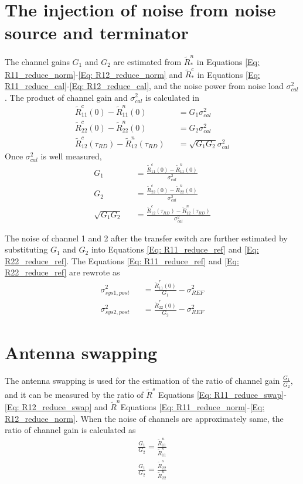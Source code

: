 \documentclass[draftcls]{IEEEtran}
\begin{document}
\section{The injection of noise from noise source and terminator}
The channel gains $G_1$ and $G_2$ are estimated from  $\tilde{R}^n_*$ in Equations \ref{Eq: R11_reduce_norm}-\ref{Eq: R12_reduce_norm} and $\tilde{R}^c_*$ in Equations \ref{Eq: R11_reduce_cal}-\ref{Eq: R12_reduce_cal}, and the noise power from noise load $\sigma^2_{cal}$. The product of channel gain and $\sigma^2_{cal}$ is calculated in
\begin{eqnarray}
	\tilde{R}^c_{11}(0) - \tilde{R}^n_{11}(0)&&= G_1\sigma^2_{cal} \label{Eq: Cal_channel_gain1a} \\
    \tilde{R}^c_{22}(0) - \tilde{R}^n_{22}(0)&&= G_2\sigma^2_{cal} \label{Eq: Cal_channel_gain2a} \\
    \tilde{R}^c_{12}(\tau_{RD}) - \tilde{R}^n_{12}(\tau_{RD})&&= \sqrt{G_1 G_2}\sigma^2_{cal} \label{Eq: Cal_channel_gain12a}
\end{eqnarray}
Once $\sigma^2_{cal}$ is well measured, 
\begin{eqnarray}
	G_1 &&= \frac{\tilde{R}^c_{11}(0) - \tilde{R}^n_{11}(0)}{\sigma^2_{cal}}  \label{Eq: Cal_channel_gain1} \\
    G_2 &&= \frac{\tilde{R}^c_{22}(0) - \tilde{R}^n_{22}(0)}{\sigma^2_{cal}}  \label{Eq: Cal_channel_gain2} \\
    \sqrt{G_1 G_2} &&= \frac{\tilde{R}^c_{12}(\tau_{RD}) - \tilde{R}^n_{12}(\tau_{RD})}{\sigma^2_{cal}}  \label{Eq: Cal_channel_gain12}
\end{eqnarray}

The noise of channel 1 and 2 after the transfer switch are further estimated by substituting $G_1$ and $G_2$ into Equations \ref{Eq: R11_reduce_ref} and \ref{Eq: R22_reduce_ref}. The Equations \ref{Eq: R11_reduce_ref} and \ref{Eq: R22_reduce_ref} are rewrote as
\begin{eqnarray}
	\sigma^2_{sys1,post} &&= \frac{\tilde{R}^r_{11}(0) }{G_1}-\sigma^2_{REF}  \label{Eq: Cal_channel_noise1} \\
    \sigma^2_{sys2,post} &&= \frac{\tilde{R}^r_{22}(0) }{G_2}-\sigma^2_{REF}  \label{Eq: Cal_channel_noise2} 
\end{eqnarray}
\section{Antenna swapping}
The antenna swapping \cite{Alejandro:2013} is used for the estimation of the ratio of channel gain $\frac{G_1}{G_2}$, and it can be measured by the ratio of $\tilde{R}^s$ Equations \ref{Eq: R11_reduce_swap}-\ref{Eq: R12_reduce_swap} and $\tilde{R}^n$Equations \ref{Eq: R11_reduce_norm}-\ref{Eq: R12_reduce_norm}. When the noise of channels are approximately same, the ratio of channel gain is calculated as
\begin{eqnarray}
	\frac{G_1}{G_2} = \frac{\tilde{R}^n_{11}}{\tilde{R}^s_{11}} \\
    \frac{G_1}{G_2} = \frac{\tilde{R}^s_{22}}{\tilde{R}^n_{22}}  \label{Eq: Cal_channel_gain_ratio}
\end{eqnarray}
\end{document}
